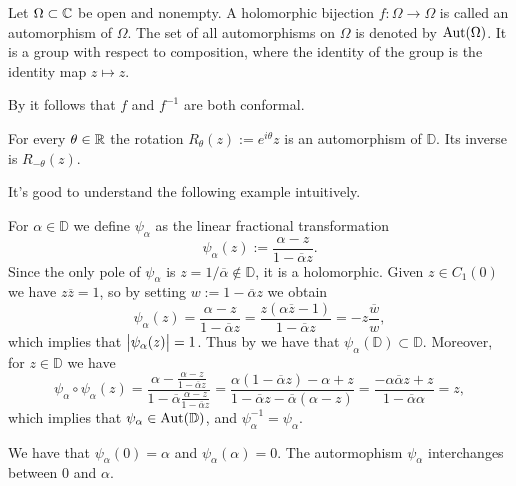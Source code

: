 \documentclass[11pt,a4paper]{article}
\begin{document}
\begin{definition}[Automorphism]
  Let $\Omega \subset \mathbb{C}$ be open and nonempty.
  A holomorphic bijection $f \colon \Omega \to \Omega$ is called an automorphism
  of $\Omega$.
  The set of all automorphisms on $\Omega$ is denoted by $\operatorname{Aut}(\Omega)$.
  It is a group with respect to composition, where the identity of the group
  is the identity map $z \mapsto z$.
\end{definition}
\begin{remark}
  By  it follows that
  $f$ and $f^{-1}$ are both conformal.
\end{remark}

\begin{example}
  For every $\theta \in \mathbb{R}$ the rotation $R_{\theta}(z) := e^{i \theta} z$
  is an automorphism of $\mathbb D$.
  Its inverse is $R_{-\theta}(z)$.
\end{example}

\begin{remark}
  It's good to understand the following example intuitively.
\end{remark}

\begin{example}
  For $\alpha \in \mathbb D$ we define $\psi_{\alpha}$ as the linear fractional
  transformation
  \[
    \psi_{\alpha}(z) := \frac{\alpha - z}{1 - \overline \alpha z}.
  \]
  Since the only pole of $\psi_{\alpha}$ is
  $z = 1 / \overline \alpha \notin \mathbb D$, it is a holomorphic.
  Given $z \in C_1(0)$ we have $z \overline z = 1$, so by setting
  $w := 1 - \overline \alpha z$ we obtain
  \[
    \psi_{\alpha}(z) =
    \frac{\alpha - z}{1 - \overline \alpha z} =
    \frac{z (\alpha \overline z - 1)}{1 - \overline \alpha z} =
    -z \frac{\overline w}{w},
  \]
  which implies that $\left\lvert\psi_{\alpha}(z)\right\rvert = 1$.
  Thus by  we have that
  $\psi_{\alpha}(\mathbb D) \subset \mathbb D$.
  Moreover, for $z \in \mathbb D$ we have
  \[
    \psi_{\alpha} \circ \psi_{\alpha}(z) =
    \frac{\alpha - \frac{\alpha - z}{1 - \overline \alpha z}}{1 - \overline \alpha \frac{\alpha - z}{1 - \overline \alpha z}} =
    \frac{\alpha (1 - \overline \alpha z) - \alpha + z}{1 - \overline \alpha z - \overline \alpha(\alpha - z)} =
    \frac{-\alpha \overline \alpha z + z}{1 - \overline \alpha \alpha} = z,
  \]
  which implies that $\psi_{\alpha} \in \operatorname{Aut}(\mathbb D)$, and
  $\psi_{\alpha}^{-1} = \psi_{\alpha}$.
\end{example}
\begin{remark}
  We have that $\psi_{\alpha}(0) = \alpha$ and $\psi_{\alpha}(\alpha) = 0$.
  The autormophism $\psi_{\alpha}$ interchanges between $0$ and $\alpha$.
\end{remark}
\end{document}
